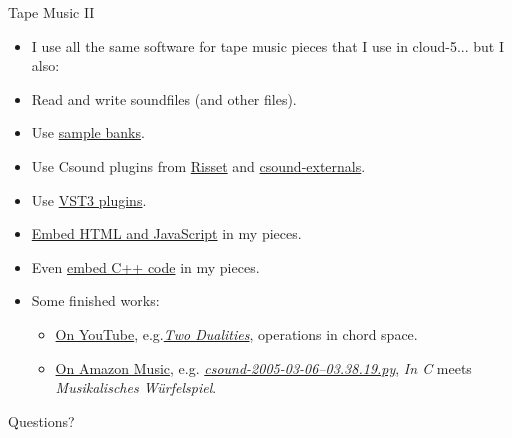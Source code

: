 \documentclass{beamer}
\begin{document}
\begin{frame}{Tape Music II}

\begin{itemize}
\item I use all the same software for tape music pieces that I use in cloud-5... but I also:
\item Read and write soundfiles (and other files).
\item Use \href{https://www.zanderjaz.com/downloads/soundfonts}{sample banks}.
\item Use Csound plugins from \href{https://github.com/csound-plugins/risset-data/tree/master}{Risset} and \href{https://github.com/csound-plugins/csound-externals}{csound-externals}.
\item Use \href{https://github.com/gogins/csound-vst3-opcodes}{VST3 plugins}.
\item \href{https://github.com/gogins/csound-webserver-opcodes}{Embed HTML and JavaScript} in my pieces.
\item Even \href{https://github.com/gogins/csound-cxx-opcodes}{embed C++ code} in my pieces.
\item Some finished works: 
\begin{itemize}
\item \href{https://www.youtube.com/@michaelgogins}{On YouTube}, e.g.\href{https://music.youtube.com/watch?v=3_ahbL44p-E&si=2ScceuKnI0Pqye5G}{\emph{Two Dualities}}, operations in chord space.
\item \href{https://music.amazon.com/artists/B0016KQMPA/michael-gogins}{On Amazon Music}, e.g. \href{https://music.amazon.com/albums/B0016UPQRK?trackAsin=B0016UGIW2\&do=play\&ref=dm_sh_26UFIwpvtSDIIQmF2rIxH1qXC}{\emph{csound-2005-03-06--03.38.19.py}}, \emph{In C} meets \emph{Musikalisches Würfelspiel}. 

\end{itemize}
\end{itemize}

\end{frame}

\begin{frame}{Questions?}

\end{frame}
\end{document}
